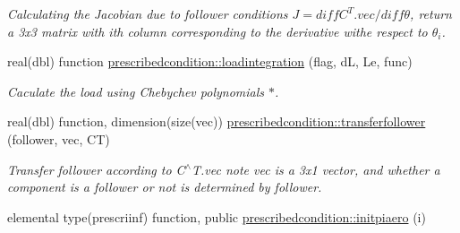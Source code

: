 \begin{DoxyCompactItemize}
\begin{DoxyCompactList}\small\item\em Calculating the Jacobian due to follower conditions $ J=diff{C^T.vec}/diff\theta $, return a 3x3 matrix with ith column corresponding to the derivative withe respect to $ \theta_i $. \end{DoxyCompactList}\item 
real(dbl) function \hyperlink{namespaceprescribedcondition_a55980eb8579eed448879c6118e6218c7}{prescribedcondition\+::loadintegration} (flag, dL, Le, func)
\begin{DoxyCompactList}\small\item\em Caculate the load using Chebychev polynomials $\ast$. \end{DoxyCompactList}\item 
real(dbl) function, dimension(size(vec)) \hyperlink{namespaceprescribedcondition_aa60c7ca2dee406dc7cda895535b36927}{prescribedcondition\+::transferfollower} (follower, vec, CT)
\begin{DoxyCompactList}\small\item\em Transfer follower according to C$^\wedge$T.vec note vec is a 3x1 vector, and whether a component is a follower or not is determined by follower. \end{DoxyCompactList}\item 
elemental type(prescriinf) function, public \hyperlink{namespaceprescribedcondition_a29eb27f666876bff8a4577eb21d5b2d1}{prescribedcondition\+::initpiaero} (i)
\end{DoxyCompactItemize}

